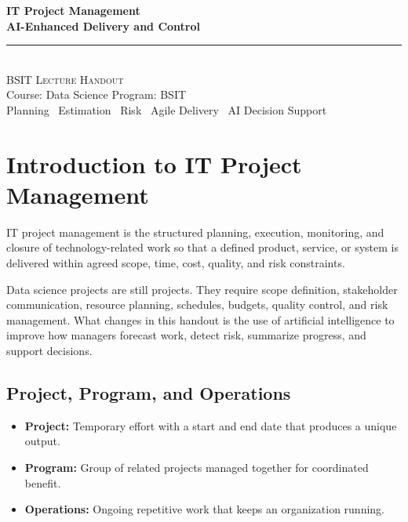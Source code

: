 \documentclass[11pt,a4paper]{article}
\begin{document}
\begin{center}
\vspace*{0.5cm}
{\Huge\bfseries\textcolor{primary}{IT Project Management}}\\[8pt]
{\Huge\bfseries\textcolor{primary}{AI-Enhanced Delivery and Control}}\\[16pt]
{\color{secondary}\rule{0.68\textwidth}{1.5pt}}\\[12pt]
{\Large\textsc{BSIT Lecture Handout}}\\[6pt]
{\large\textcolor{gray!70!black}{Course: Data Science \quad Program: BSIT}}\\[8pt]
{\normalsize\textcolor{gray!70!black}{Planning \textbullet\ Estimation \textbullet\ Risk \textbullet\ Agile Delivery \textbullet\ AI Decision Support}}
\vspace{0.3cm}
\end{center}

\tableofcontents
\newpage

\section{Introduction to IT Project Management}

\begin{definitionbox}
IT project management is the structured planning, execution, monitoring, and closure of technology-related work so that a defined product, service, or system is delivered within agreed scope, time, cost, quality, and risk constraints.
\end{definitionbox}

\begin{conceptbox}
Data science projects are still projects. They require scope definition, stakeholder communication, resource planning, schedules, budgets, quality control, and risk management. What changes in this handout is the use of artificial intelligence to improve how managers forecast work, detect risk, summarize progress, and support decisions.
\end{conceptbox}

\subsection{Project, Program, and Operations}

\begin{itemize}[leftmargin=*]
  \item \textbf{Project:} Temporary effort with a start and end date that produces a unique output.
  \item \textbf{Program:} Group of related projects managed together for coordinated benefit.
  \item \textbf{Operations:} Ongoing repetitive work that keeps an organization running.
\end{itemize}
\end{document}
